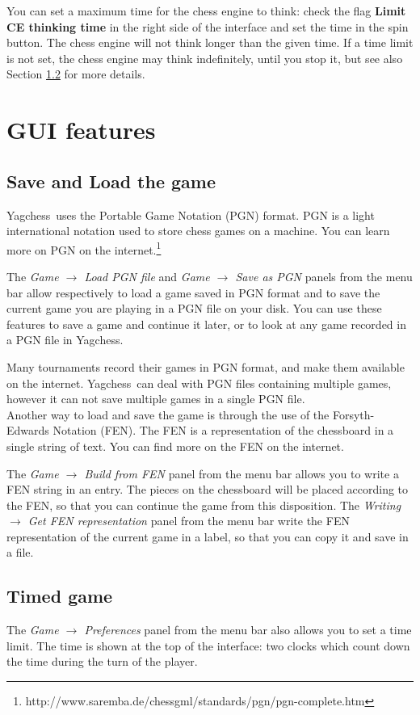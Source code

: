 \documentclass[a4paper]{article}
\newcommand{\nameprog}{Yagchess}
\begin{document}
You can set a maximum time for the chess engine to think: check the flag \textbf{Limit CE thinking time} in the right side of the interface and set the time
in the spin button. The chess engine will not think longer than the given time. If a time limit is not set, the chess engine may think indefinitely, until
you stop it, but see also Section \ref{time} for more details.


\section{GUI features}
\label{gamefeat}
\subsection{Save and Load the game}
\label{saveload}
\nameprog\ uses the Portable Game Notation (PGN) format. PGN is a light international notation used to store chess games on a machine.
You can learn more on PGN on the internet.\footnote{http://www.saremba.de/chessgml/standards/pgn/pgn-complete.htm}

The \textit{Game $\rightarrow$ Load PGN file} and \textit{Game $\rightarrow$ Save as PGN} panels from the menu bar allow respectively to load a game saved in PGN format
and to save the current game you are playing in a PGN file on your disk. You can use these features to save a game and continue it later, or to look at any game recorded 
in a PGN file in \nameprog.

Many tournaments record their games in PGN format, and make them available on the internet. \nameprog\ can deal with PGN files containing multiple games, however it
can not save multiple games in a single PGN file.\\

Another way to load and save the game is through the use of the Forsyth-Edwards Notation (FEN). The FEN is a representation of the chessboard in a single string of text. You
can find more on the FEN on the internet.

The \textit{Game $\rightarrow$ Build from FEN} panel from the menu bar allows you to write a FEN string in an entry. The pieces on the chessboard will be placed according
to the FEN, so that you can continue the game from this disposition. The \textit{Writing $\rightarrow$ Get FEN representation} panel
from the menu bar write the FEN representation of the current game in a label, so that you can copy it and save in a file.


\subsection{Timed game}
\label{time}
The \textit{Game $\rightarrow$ Preferences} panel from the menu bar also allows you to set a time limit. The time is shown at the top of the interface: two clocks
which count down the time during the turn of the player.
\end{document}

